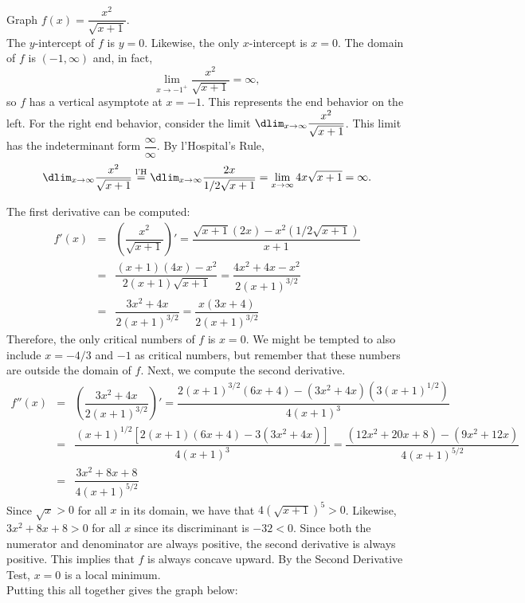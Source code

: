 \documentclass{book}
\newcommand{\lHeq}{\overset{\text{l'H}}{=}}
\begin{document}
\begin{Exam} Graph $f(x) = \dfrac{x^2}{\sqrt{x+1}}$.\\

The $y$-intercept of $f$ is $y=0$. Likewise, the only $x$-intercept is $x=0$. The domain of $f$ is $(-1,\infty)$ and, in fact, \[\lim_{x\to -1^+} \dfrac{x^2}{\sqrt{x+1}} = \infty,\] so $f$ has a vertical asymptote at $x=-1$. This represents the end behavior on the left. For the right end behavior, consider the limit $\dlim_{x\to \infty} \dfrac{x^2}{\sqrt{x+1}}$. This limit has the indeterminant form $\dfrac{\infty}{\infty}$. By l'Hospital's Rule,
\[\dlim_{x\to \infty} \dfrac{x^2}{\sqrt{x+1}} \lHeq \dlim_{x\to \infty} \dfrac{2x}{1/2\sqrt{x+1}} = \lim_{x\to \infty} 4x\sqrt{x+1} = \infty.\] 

The first derivative can be computed: 
\begin{eqnarray*}
f'(x) &=& \left(\dfrac{x^2}{\sqrt{x+1}}\right)' = \dfrac{\sqrt{x+1}(2x) - x^2(1/2\sqrt{x+1})}{x+1}\\
 &= &\dfrac{(x+1)(4x)- x^2}{2(x+1)\sqrt{x+1}} = \dfrac{4x^2+4x-x^2}{2(x+1)^{3/2}}\\
 &=& \dfrac{3x^2+4x}{2(x+1)^{3/2}} = \dfrac{x(3x+4)}{2(x+1)^{3/2}}
\end{eqnarray*} Therefore, the only critical numbers of $f$ is $x= 0$. We might be tempted to also include $x= - 4/3$ and $-1$ as critical numbers, but remember that these numbers are outside the domain of $f$. Next, we compute the second derivative.
\begin{eqnarray*}
f''(x) &=& \left(\dfrac{3x^2+4x}{2(x+1)^{3/2}}\right)' = \dfrac{2(x+1)^{3/2}(6x+4) - (3x^2+4x)(3(x+1)^{1/2})}{4(x+1)^3}\\
&=& \dfrac{(x+1)^{1/2}[2(x+1)(6x+4) - 3(3x^2+4x)]}{4(x+1)^3} = \dfrac{(12x^2+20x+8) - (9x^2+12x)}{4(x+1)^{5/2}}\\
&=& \dfrac{3x^2+8x+8}{4(x+1)^{5/2}} 
\end{eqnarray*} 
Since $\sqrt{x} > 0$ for all $x$ in its domain, we have that $4(\sqrt{x+1})^5 > 0$. Likewise, $3x^2+8x+8 > 0$ for all $x$ since its discriminant is $-32<0$. Since both the numerator and denominator are always positive, the second derivative is always positive. This implies that $f$ is always concave upward. By the Second Derivative Test, $x=0$ is a local minimum.\\

Putting this all together gives the graph below:

\begin{center}
\end{center}
\end{Exam}\vs
\end{document}
